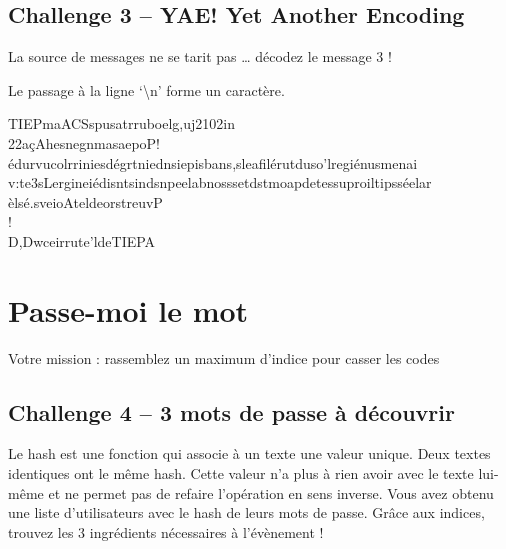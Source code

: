 \documentclass{article}
\begin{document}
	\subsection*{Challenge 3 – YAE! Yet Another Encoding}
	
	La source de messages ne se tarit pas … décodez le message 3 !
	\begin{helpbox}
		Le passage à la ligne ‘\textbackslash n’ forme un caractère.
	\end{helpbox}
	
	\begin{messagebox}[blue]{}
		TIEPmaACSspusatrruboelg,uj2102in\\
		22açAhesnegnmasaepoP!\\
		édurvucolrriniesdégrtniednsiepisbans,sleafilérutduso'lregiénusmenai\\
		v:te3sLergineiédisntsindsnpeelabnosssetdstmoapdetessuproiltipsséelar\\
		èlsé.sveioAteldeorstreuvP\\
		!\\
		D,Dwceirrute'ldeTIEPA
	\end{messagebox}
	
	\section*{Passe-moi le mot}
	
	\begin{infobox}
		Votre mission : rassemblez un maximum d’indice pour casser les codes
	\end{infobox}
	
	\subsection*{Challenge 4 – 3 mots de passe à découvrir}
	
	Le hash est une fonction qui associe à un texte une valeur unique. Deux textes identiques ont le même hash. Cette valeur n’a plus à rien avoir avec le texte lui-même et ne permet pas de refaire l’opération en sens inverse.
	Vous avez obtenu une liste d’utilisateurs avec le hash de leurs mots de passe.
	Grâce aux indices, trouvez les 3 ingrédients nécessaires à l’évènement !
	
\end{document}
